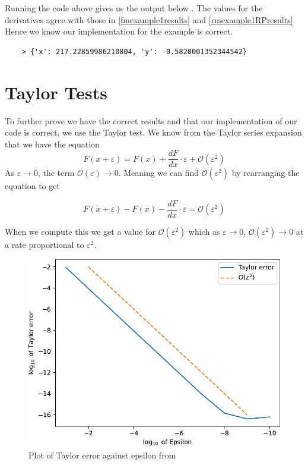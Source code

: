 \documentclass{article}
\begin{document}
Running the code above gives us the output below \cite{github}. The values for the derivatives agree with those in \eqref{fmexample1results} and \eqref{rmexample1RPresults}. Hence we know our implementation for the example is correct.
\begin{verbatim}
    > {'x': 217.22859986210804, 'y': -0.5820001352344542}
\end{verbatim}

\section{Taylor Tests}

To further prove we have the correct results and that our implementation of our code is correct, we use the Taylor test. We know from the Taylor series expansion that we have the equation
\begin{equation}
    F(x + \varepsilon) = F(x) + \frac{dF}{dx} \cdot \varepsilon + \mathcal{O}(\varepsilon ^ 2)
\end{equation}
As $\varepsilon \longrightarrow 0$, the term $\mathcal{O}(\varepsilon) \longrightarrow 0$. Meaning we can find $\mathcal{O}(\varepsilon^2)$ by rearranging the equation to get

\begin{equation}
    F(x + \varepsilon) - F(x) - \frac{dF}{dx} \cdot \varepsilon = \mathcal{O}(\varepsilon^2)
\end{equation}

When we compute this we get a value for $\mathcal{O}(\varepsilon^2)$ which as $\varepsilon \longrightarrow 0$, $\mathcal{O}(\varepsilon^2) \longrightarrow 0$ at a rate proportional to $\varepsilon^2$.

\begin{figure}[h!]
    \includegraphics[width=12cm]{images/taylor_error_1.pdf}
    \caption{Plot of Taylor error against epsilon from \cite{github}}
    \label{fig:taylorerror}
\end{figure}
\end{document}
